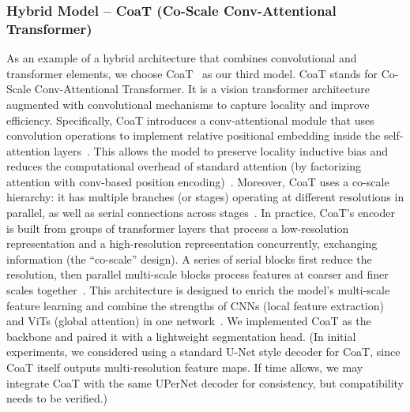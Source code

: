\documentclass[conference]{IEEEtran}
\begin{document}
\subsubsection{Hybrid Model – CoaT (Co-Scale Conv-Attentional Transformer)}
As an example of a hybrid architecture that combines convolutional and transformer elements, we choose CoaT~\cite{xu_co-scale_2021} as our third model. CoaT stands for Co-Scale Conv-Attentional Transformer. It is a vision transformer architecture augmented with convolutional mechanisms to capture locality and improve efficiency. Specifically, CoaT introduces a conv-attentional module that uses convolution operations to implement relative positional embedding inside the self-attention layers~\cite{xu_co-scale_2021}. This allows the model to preserve locality inductive bias and reduces the computational overhead of standard attention (by factorizing attention with conv-based position encoding)~\cite{xu_co-scale_2021}. Moreover, CoaT uses a co-scale hierarchy: it has multiple branches (or stages) operating at different resolutions in parallel, as well as serial connections across stages~\cite{xu_co-scale_2021}. In practice, CoaT’s encoder is built from groups of transformer layers that process a low-resolution representation and a high-resolution representation concurrently, exchanging information (the “co-scale” design). A series of serial blocks first reduce the resolution, then parallel multi-scale blocks process features at coarser and finer scales together~\cite{xu_co-scale_2021}. This architecture is designed to enrich the model’s multi-scale feature learning and combine the strengths of CNNs (local feature extraction) and ViTs (global attention) in one network~\cite{xu_co-scale_2021}. We implemented CoaT as the backbone and paired it with a lightweight segmentation head. (In initial experiments, we considered using a standard U-Net style decoder for CoaT, since CoaT itself outputs multi-resolution feature maps. If time allows, we may integrate CoaT with the same UPerNet decoder for consistency, but compatibility needs to be verified.) 
\end{document}
